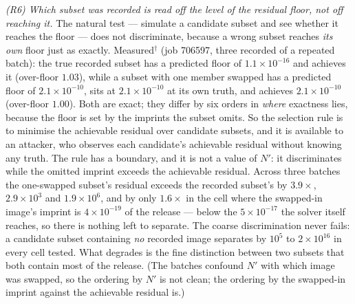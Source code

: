 \emph{(R6) Which subset was recorded is read off the level of the residual
floor, not off reaching it.} The natural test --- simulate a candidate subset
and see whether it reaches the floor --- does not discriminate, because a
wrong subset reaches \emph{its own} floor just as exactly. Measured$^\dagger$
(job 706597, three recorded of a repeated batch): the true recorded subset has
a predicted floor of $1.1\times10^{-16}$ and achieves it (over-floor $1.03$),
while a subset with one member swapped has a predicted floor of
$2.1\times10^{-10}$, sits at $2.1\times10^{-10}$ at its own truth, and
achieves $2.1\times10^{-10}$ (over-floor $1.00$). Both are exact; they differ
by six orders in \emph{where} exactness lies, because the floor is set by the
imprints the subset omits. So the selection rule is to minimise the achievable
residual over candidate subsets, and it is available to an attacker, who
observes each candidate's achievable residual without knowing any truth. The
rule has a boundary, and it is not a value of $N'$: it discriminates while the
omitted imprint exceeds the achievable residual. Across three batches the
one-swapped subset's residual exceeds the recorded subset's by $3.9\times$,
$2.9\times10^{3}$ and $1.9\times10^{6}$, and by only $1.6\times$ in the cell
where the swapped-in image's imprint is $4\times10^{-19}$ of the release ---
below the $5\times10^{-17}$ the solver itself reaches, so there is nothing
left to separate. The coarse discrimination never fails: a candidate subset
containing \emph{no} recorded image separates by $10^{5}$ to $2\times10^{16}$
in every cell tested. What degrades is the fine distinction between two
subsets that both contain most of the release. (The batches confound $N'$ with
which image was swapped, so the ordering by $N'$ is not clean; the ordering by
the swapped-in imprint against the achievable residual is.)

